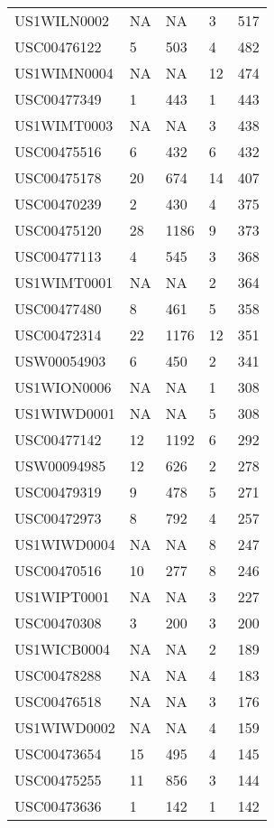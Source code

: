 \begin{longtable}{l l l l l}
				  US1WILN0002 & NA & NA &   3 & 517 \\ 
				  USC00476122 &   5 & 503 &   4 & 482 \\ 
				  US1WIMN0004 & NA & NA &  12 & 474 \\ 
				  USC00477349 &   1 & 443 &   1 & 443 \\ 
				  US1WIMT0003 & NA & NA &   3 & 438 \\ 
				  USC00475516 &   6 & 432 &   6 & 432 \\ 
				  USC00475178 &  20 & 674 &  14 & 407 \\ 
				  USC00470239 &   2 & 430 &   4 & 375 \\ 
				  USC00475120 &  28 & 1186 &   9 & 373 \\ 
				  USC00477113 &   4 & 545 &   3 & 368 \\ 
				  US1WIMT0001 & NA & NA &   2 & 364 \\ 
				  USC00477480 &   8 & 461 &   5 & 358 \\ 
				  USC00472314 &  22 & 1176 &  12 & 351 \\ 
				  USW00054903 &   6 & 450 &   2 & 341 \\ 
				  US1WION0006 & NA & NA &   1 & 308 \\ 
				  US1WIWD0001 & NA & NA &   5 & 308 \\ 
				  USC00477142 &  12 & 1192 &   6 & 292 \\ 
				  USW00094985 &  12 & 626 &   2 & 278 \\ 
				  USC00479319 &   9 & 478 &   5 & 271 \\ 
				  USC00472973 &   8 & 792 &   4 & 257 \\ 
				  US1WIWD0004 & NA & NA &   8 & 247 \\ 
				  USC00470516 &  10 & 277 &   8 & 246 \\ 
				  US1WIPT0001 & NA & NA &   3 & 227 \\ 
				  USC00470308 &   3 & 200 &   3 & 200 \\ 
				  US1WICB0004 & NA & NA &   2 & 189 \\ 
				  USC00478288 & NA & NA &   4 & 183 \\ 
				  USC00476518 & NA & NA &   3 & 176 \\ 
				  US1WIWD0002 & NA & NA &   4 & 159 \\ 
				  USC00473654 &  15 & 495 &   4 & 145 \\ 
				  USC00475255 &  11 & 856 &   3 & 144 \\ 
				  USC00473636 &   1 & 142 &   1 & 142 \\ 

\end{longtable}
